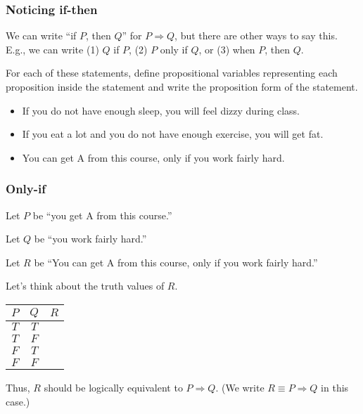 \begin{frame}\frametitle{Noticing if-then}
  We can write ``if $P$, then $Q$'' for $P\Rightarrow Q$, but there
  are other ways to say this. E.g., we can write (1) $Q$ if $P$, (2) $P$
  only if $Q$, or (3) when $P$, then $Q$.

  \pause

  \begin{tcolorbox}[title=Quick check 2]
    For each of these statements, define
    propositional variables representing each proposition inside the
    statement and write the proposition form of the statement.
    \begin{itemize}
    \item If you do not have enough sleep, you will feel dizzy during class.
    \item If you eat a lot and you do not have enough exercise, you will
      get fat.
    \item You can get A from this course, only if you work fairly hard.
    \end{itemize}
  \end{tcolorbox}
  
\end{frame}

\begin{frame}\frametitle{Only-if}
  Let $P$ be ``you get A from this course.''

  Let $Q$ be ``you work fairly hard.''
  
  Let $R$ be ``You can get A from this course, only if you work fairly hard.''

  Let's think about the truth values of $R$.
  
  \begin{tcolorbox}[title=Only if you work fairly hard.]
    \begin{tabular}{|c|c||c|}
      \hline
      $P$ & $Q$ & $R$ \\
      \hline
      $T$ & $T$ & \\
      $T$ & $F$ & \\
      $F$ & $T$ & \\
      $F$ & $F$ & \\
      \hline
    \end{tabular}
  \end{tcolorbox}
  \pause

  Thus, $R$ should be logically equivalent to $P\Rightarrow Q$.  (We
  write $R\equiv P\Rightarrow Q$ in this case.)
\end{frame}

